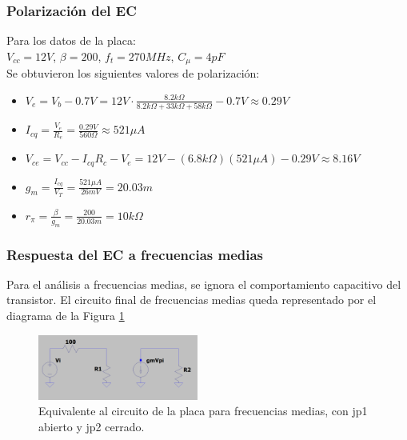 \documentclass[letterpaper, 10 pt, conference]{ieeeconf}  %
\begin{document}
\subsubsection{Polarización del EC}
Para los datos de la placa:\\
$V_{cc} = 12V$, $\beta = 200$, $f_t = 270MHz$, $C_{\mu} = 4pF$\\
Se obtuvieron los siguientes valores de polarización:\\

\begin{itemize}
    \item $V_{e} = V_b - 0.7V = 12V \cdot \frac{8.2k\Omega}{8.2k\Omega + 33k\Omega + 58k\Omega} -0.7V \approx 0.29V$\\
    \item $I_{cq} = \frac{V_e}{R_e} = \frac{0.29V}{560\Omega} \approx 521 \mu A$\\
    \item $V_{ce} = V_{cc} - I_{cq}R_c - V_e = 12V - (6.8k\Omega)(521 \mu A) - 0.29V \approx 8.16V$\\
    \item $g_m = \frac{I_{cq}}{V_T} = \frac{521\mu A}{26mV} = 20.03m$\\
    \item $r_{\pi} = \frac{\beta}{g_m} = \frac{200}{20.03m} = 10k\Omega$\\
\end{itemize}




\subsubsection{Respuesta del EC a frecuencias medias}
Para el análisis a frecuencias medias, se ignora el comportamiento capacitivo del transistor. El circuito final de frecuencias medias queda representado por el diagrama de la Figura \ref{fig:ECfreq_medias}

\begin{figure}[H]
  \centering
  \includegraphics[width=0.47\textwidth]{imagenes/freq medias EC.png}
  \caption{Equivalente al circuito de la placa para frecuencias medias, con jp1 abierto y jp2 cerrado.}
  \label{fig:ECfreq_medias}
\end{figure}
\end{document}
